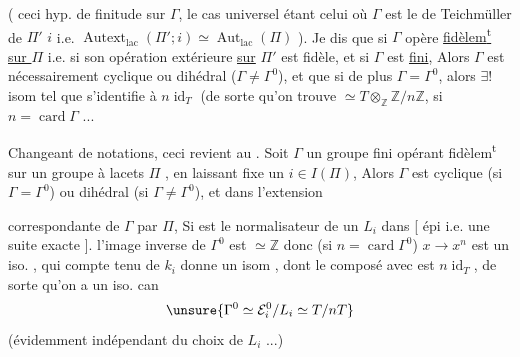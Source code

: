 ( ceci   hyp. de finitude sur
$\Gamma$, le cas universel étant celui où $\Gamma$
est le  de Teichmüller de $\Pi'$  $i$
i.e. $\operatorname{Autext}_{\mathrm{lac}}(\Pi';i)\simeq\operatorname{Aut}_{\mathrm{lac}}(\Pi)$ ). Je
dis que si $\Gamma$ opère \uline{fidèlem\textsuperscript{t}} \uline{sur $\Pi$}
i.e. si son opération extérieure \uline{sur}
\uline{$\Pi'$} est fidèle, et si $\Gamma$ est \uline{fini},
Alors $\Gamma$ est nécessairement cyclique 
ou dihédral ($\Gamma\ne\Gamma^0$), et que si de
plus $\Gamma=\Gamma^0$, alors   $\exists!$ isom
 tel que  s'identifie à
$n\operatorname{id}_T$ (de sorte qu'on trouve 
$\simeq T\otimes_{\mathbb Z}\mathbb Z/n\mathbb Z$, si $n=\operatorname{card}\Gamma$ ...

Changeant de notations, ceci revient au
 .
Soit $\Gamma$ un groupe fini opérant
fidèlem\textsuperscript{t} sur un groupe  à
lacets $\Pi$ , en laissant fixe un $i\in I(\Pi)$,
Alors $\Gamma$ est cyclique (si $\Gamma=\Gamma^0$) ou
dihédral (si $\Gamma\ne\Gamma^0$), et dans l'extension


correspondante   de $\Gamma$ par $\Pi$,
Si  est le normalisateur de un $L_i$ dans
 [    épi i.e. une suite exacte
 ]. l'image inverse  de
$\Gamma^0$ est $\simeq\mathbb Z$ donc (si $n=\operatorname{card}\Gamma^0$)\inserted{\unsure{$=[\mathcal E_i^0:L_i]$}}
 $x\to x^n$ est un iso.  , qui
compte tenu de $k_i$ donne un
isom , dont le composé avec
  est $n\operatorname{id}_T$, de sorte
qu'on a un iso. can
\[\unsure{\Gamma^0\simeq\mathcal E_i^0/L_i\simeq T/nT}\]
(évidemment indépendant du choix de $L_i$ ...)

